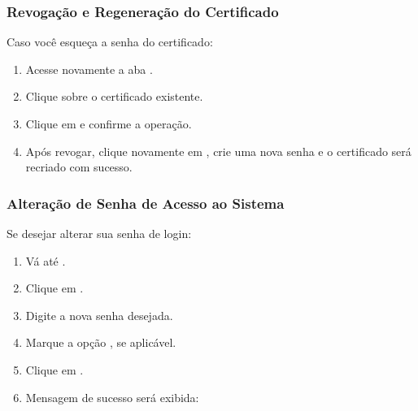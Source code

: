 \documentclass[letterpaper,10pt,brazil]{sphinxmanual}
\begin{document}
\subsubsection{Revogação e Regeneração do Certificado}
\label{\detokenize{projud_02_senhacertificado:revogacao-e-regeneracao-do-certificado}}
\sphinxAtStartPar
Caso você esqueça a senha do certificado:
\begin{enumerate}
%
\item {} 
\sphinxAtStartPar
Acesse novamente a aba .

\item {} 
\sphinxAtStartPar
Clique sobre o certificado existente.

\item {} 
\sphinxAtStartPar
Clique em  e confirme a operação.

\item {} 
\sphinxAtStartPar
Após revogar, clique novamente em , crie uma nova senha e o certificado será recriado com sucesso.

\end{enumerate}


\subsubsection{Alteração de Senha de Acesso ao Sistema}
\label{\detokenize{projud_02_senhacertificado:alteracao-de-senha-de-acesso-ao-sistema}}
\sphinxAtStartPar
Se desejar alterar sua senha de login:
\begin{enumerate}
%
\item {} 
\sphinxAtStartPar
Vá até .

\item {} 
\sphinxAtStartPar
Clique em .

\item {} 
\sphinxAtStartPar
Digite a nova senha desejada.

\item {} 
\sphinxAtStartPar
Marque a opção , se aplicável.

\item {} 
\sphinxAtStartPar
Clique em .

\item {} 
\sphinxAtStartPar
Mensagem de sucesso será exibida: 

\end{enumerate}
\end{document}

